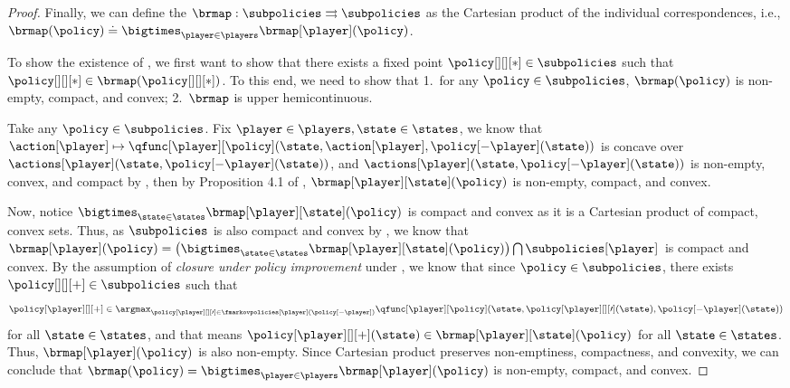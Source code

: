 \begin{proof}
    Finally, we can define the  $\brmap: \subpolicies \rightrightarrows \subpolicies$ as the Cartesian product of the individual correspondences, i.e., $\brmap(\policy) \doteq \bigtimes_{\player \in \players} \brmap[\player] (\policy)$.

    To show the existence of \MPGNE{}, we first want to show that there exists a fixed point $\policy[][][*] \in \subpolicies$ such that $\policy[][][*] \in \brmap(\policy[][][*])$. 
    To this end, we need to show that 1.~for any $\policy\in \subpolicies$, $\brmap(\policy)$ is non-empty, compact, and convex; 2.~$\brmap$ is upper hemicontinuous.
    
    Take any $\policy\in \subpolicies$. 
    Fix $\player \in \players, \state \in \states$, 
     we know that $\action[\player] \mapsto \qfunc[\player][{\policy}] (\state, \action[\player], \policy[-\player] (\state))$ is concave over $\actions[\player] (\state, \policy[-\player] (\state))$, and $\actions[\player] (\state, \policy[-\player] (\state))$ is non-empty, convex, and compact by , then by Proposition 4.1 of \citet{fiacco1986convexity}, $\brmap[\player][\state] (\policy)$ is non-empty, compact, and convex. 
    
    Now, notice $\bigtimes_{\state \in \states} \brmap[\player][\state] (\policy)$ is compact and convex as it is a Cartesian product of compact, convex sets. Thus, as $\subpolicies$ is also compact and convex by , we know that $\brmap[\player] (\policy) = \left(\bigtimes_{\state \in \states} \brmap[\player][\state] (\policy) \right) \bigcap \subpolicies[\player]$ is compact and convex. 
    By the assumption of \emph{closure under policy improvement} under , we know that since $\policy \in \subpolicies$, there exists $\policy[][][+] \in \subpolicies$ such that 
    $$\policy[\player][][+] \in \argmax_{\policy[\player][][\prime] \in \fmarkovpolicies[\player] (\policy[-\player])} \qfunc[\player][\policy] (\state, \policy[\player][][\prime] (\state), \policy[-\player] (\state))$$ for all $\state \in \states$, and that means $\policy[\player][][+] (\state) \in \brmap[\player][\state] (\policy)$ for all $\state \in \states$. Thus, $\brmap[\player] (\policy)$ is also non-empty. 
     Since Cartesian product preserves non-emptiness, compactness, and convexity, we can conclude that 
    $\brmap(\policy) = \bigtimes_{\player \in \players} \brmap[\player] (\policy)$ is non-empty, compact, and convex. 
    

\end{proof}
